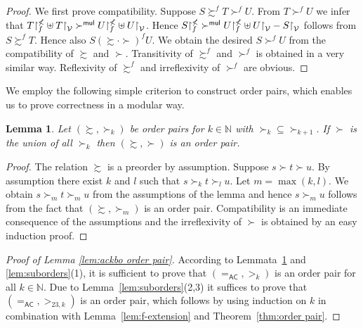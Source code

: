 \documentclass{tlp}
\newtheorem{lemma}[theorem]{Lemma}
\newcommand{\m}[1]{\mathsf{#1}}
\newcommand{\mc}[1]{\mathcal{#1}}
\newcommand{\mr}[1]{\mathrm{#1}}
\newcommand{\mul}{\m{mul}}
\newcommand{\VV}{\mc{V}}
\newcommand{\AC}{\mr{\m{AC}}}
\newcommand{\rrs}[3][f]{{#2}{\restriction}^{\smash{#3}}_{#1}}
\newcommand{\Nat}{\mathbb{N}}
\newcommand{\GT}{\mathrel{\succ}}
\newcommand{\GS}{\mathrel{\succsim}}
\begin{document}
\begin{proof}
We first prove compatibility. 
Suppose $S \GS^f T \GT^f U$.
From $T \GT^f U$ we infer that
$\rrs{T}{\nless} \uplus T{\restriction}_\VV \GT^\mul
\rrs{U}{\nless} \uplus U{\restriction}_\VV$.
Hence
$\rrs{S}{\nless} \GT^\mul \rrs{U}{\nless} \uplus U{\restriction}_\VV -
S{\restriction}_\VV$
follows from $S \GS^f T$.
Hence also
$S \mathrel{({\GS} \cdot {\GT})}^f U$.
We obtain the desired $S \GT^f U$ from
the compatibility of $\GS$ and $\GT$.
Transitivity of $\GS^f$ and $\GT^f$ is obtained in a very similar way.
Reflexivity of $\GS^f$ and irreflexivity of $\GT^f$ are obvious.
\end{proof}

We employ the following simple criterion to construct order pairs,
which enables us to prove correctness in a modular way.

\begin{lemma}
\label{lem:chain}
Let $({\GS},{\GT_k})$ be order pairs for $k \in \Nat$ with
${\GT_k} \subseteq {\GT_{k+1}}$. If $\GT$ is the union of all $\GT_k$ then
$({\GS},{\GT})$ is an order pair.
\end{lemma}

\begin{proof}
The relation $\GS$ is a preorder by assumption.
Suppose $s \GT t \GT u$.  By assumption
there exist $k$ and $l$ such that $s \GT_k t \GT_l u$. Let
$m = \max(k,l)$.  We obtain
$s \GT_m t \GT_m u$ from the assumptions of the lemma and hence $s \GT_m u$
follows from the fact that $({\GS},{\GT_m})$ is an order pair.
Compatibility is an immediate consequence of the assumptions
and the irreflexivity of $\GT$
is obtained by an easy induction proof.
\end{proof}

\begin{proof}[Proof of Lemma \ref{lem:ackbo order pair}]
According to Lemmata~\ref{lem:chain} and \ref{lem:suborders}(1), it is
sufficient to prove that $({=_\AC},{>_k})$ is an order pair for all
$k \in \Nat$. Due to Lemma~\ref{lem:suborders}(2,3) it suffices
to prove that $({=_\AC},{>_{23,k}})$ is an order pair,
which follows by using induction on $k$ in combination
with Lemma~\ref{lem:f-extension} and Theorem~\ref{thm:order pair}.
\end{proof}
\end{document}
